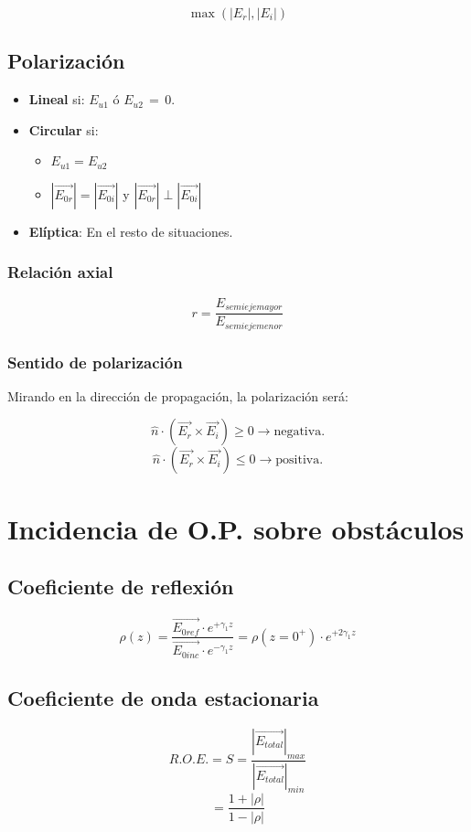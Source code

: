 \documentclass[12pt,a4paper]{article}
\begin{document}
\[ \max{\left(|E_r|, |E_i|\right)} \]

\subsection{Polarización}
\label{sub:polarizacion}

\begin{itemize}
		\item \textbf{Lineal} si:
				$ E_{u1} $ ó $ E_{u2} \, = \, 0$.
		\item \textbf{Circular} si:
				\begin{itemize}
						\item $ E_{u1} = E_{u2} $ 
						\item $ |\vec{E_{0r}}| = |\vec{E_{0i}}| $ y $ |\vec{E_{0r}}| \perp |\vec{E_{0i}}| $ 
				\end{itemize}
		\item \textbf{Elíptica}:
				En el resto de situaciones.
\end{itemize}

\subsubsection{Relación axial}
\label{ssub:relacion_axial}

\[ r = \frac{E_{semieje mayor}}{E_{semieje menor}} \] 

\subsubsection{Sentido de polarización}
\label{ssub:sentido_de_polarizacion}

Mirando en la dirección de propagación, la polarización será:

\[ \hat{n} \cdot \left( \vec{E_r} \times \vec{E_i} \right) \geq 0
\rightarrow \mbox{negativa}. \]
\[ \hat{n} \cdot \left( \vec{E_r} \times \vec{E_i} \right) \leq 0
\rightarrow \mbox{positiva}. \]

\section{Incidencia de O.P. sobre obstáculos}
\label{sec:incidencia_de_o_p_sobre_obstaculos}

\subsection{Coeficiente de reflexión}
\label{sub:coeficiente_de_reflexion}

\[ \rho (z) = \frac{\vec{E_{0 ref}} \cdot e^{+\gamma_1 z}}{\vec{E_{0 inc}}
\cdot e^{-\gamma_1 z}} = \rho (z=0^+) \cdot e^{+2\gamma_1 z} \]

\subsection{Coeficiente de onda estacionaria}
\label{sub:coeficiente_de_onda_estacionaria}

\[ R.O.E. = S = \frac{\left| \vec{E_{total}} \right|_{max}}{\left|
\vec{E_{total}} \right|_{min}} \]
\[ = \frac{1+|\rho|}{1-|\rho|}  \]
\end{document}
